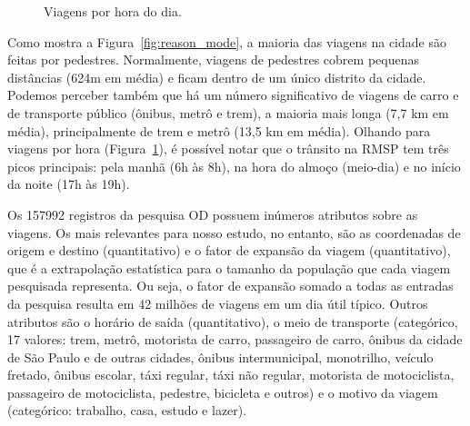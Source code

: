 \begin{figure}
\caption{Viagens por hora do dia.}
\label{fig:trips_by_hour}
\end{figure}

Como mostra a Figura~\ref{fig:reason_mode}, a maioria das viagens na cidade são feitas por
pedestres. Normalmente, viagens de pedestres cobrem pequenas distâncias (624m em média)
e ficam dentro de um único distrito da cidade. Podemos perceber também que há
um número significativo de viagens de carro e de transporte público
(ônibus, metrô e trem), a maioria mais longa (7,7 km em média), principalmente
de trem e metrô (13,5 km em média). Olhando para viagens por hora (Figura~\ref{fig:trips_by_hour}),
é possível notar que o trânsito na RMSP tem três picos principais: pela manhã (6h às 8h),
na hora do almoço (meio-dia) e no início da noite (17h às 19h).

Os \num{157992} registros da pesquisa OD possuem inúmeros atributos sobre as
viagens. Os mais relevantes para nosso estudo, no entanto, são as coordenadas de
origem e destino (quantitativo) e o fator de expansão da viagem (quantitativo),
que é a extrapolação estatística para o tamanho da população que cada viagem
pesquisada representa. Ou seja, o fator de expansão somado a todas as entradas
da pesquisa resulta em 42 milhões de viagens em um dia útil típico. Outros
atributos são o horário de saída (quantitativo), o meio de transporte
(categórico, 17 valores: trem, metrô, motorista de carro, passageiro de carro,
ônibus da cidade de São Paulo e de outras cidades, ônibus intermunicipal,
monotrilho, veículo fretado, ônibus escolar, táxi regular, táxi não regular,
motorista de motociclista, passageiro de motociclista, pedestre, bicicleta e
outros) e o motivo da viagem (categórico: trabalho, casa, estudo e lazer).

